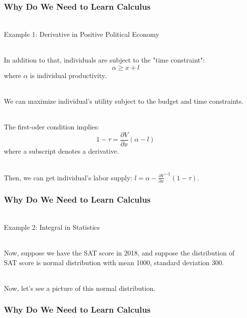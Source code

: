 \documentclass{beamer}
\numberwithin{equation}{section}
\begin{document}
\begin{frame}
\frametitle{Why Do We Need to Learn Calculus}

\ \\Example 1: Derivative in Positive Political Economy

\ \\In addition to that, individuals are subject to the "time constraint":
$$\alpha \geq x + l$$
where $\alpha$ is individual productivity. \pause

\ \\We can maximize individual's utility subject to the budget and time constraints. \pause

\ \\The first-oder condition implies:
$$1 - \tau = \frac{\partial V } {\partial x}(\alpha - l)$$
where a subscript denotes a derivative. \pause

\ \\Then, we can get individual's labor supply: $l = \alpha - \frac{\partial V } {\partial x}^{-1}(1 - \tau)$.

\end{frame}






\begin{frame}
\frametitle{Why Do We Need to Learn Calculus}

\ \\Example 2: Integral in Statistics \pause

\ \\Now, suppose we have the SAT score in 2018, and suppose the distribution of SAT score is normal distribution with mean 1000, standard deviation 300. \pause

\ \\Now, let's see a picture of this normal distribution.

\end{frame}



\begin{frame}
\frametitle{Why Do We Need to Learn Calculus}

\begin{center}
\end{center}

\end{frame}
\end{document}
